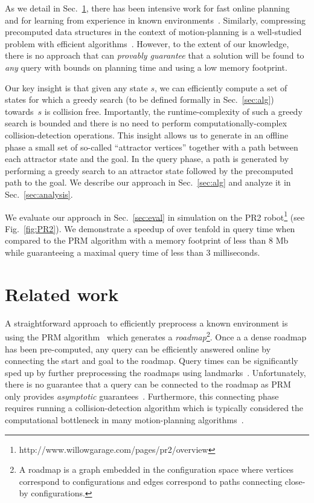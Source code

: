 \documentclass[letterpaper]{article} %
\begin{document}
As we detail in Sec.~\ref{sec:rel}, there has been intensive work 
for fast online planning~\cite{LA18} and 
for learning from experience in known environments~\cite{PCCL12,PDCL13,BAG12,CSMOC15}.
Similarly, compressing precomputed data structures in the context of motion-planning is a well-studied problem with efficient algorithms~\cite{SSAH14,DB14}.
However, to the extent of our knowledge, there is no approach that can \emph{provably guarantee} that a solution will be found to \emph{any} query with bounds on planning time and using a low memory footprint.


Our key insight is that given any state $s$, we can efficiently compute a set of states for which a greedy search (to be defined formally in Sec.~\ref{sec:alg}) towards~$s$ is collision free.
Importantly, the runtime-complexity of such a greedy search is bounded and there is no need to perform computationally-complex collision-detection operations. 
This insight allows us to generate in an offline phase a small set of so-called ``attractor vertices'' together with a path between each attractor state and the goal.
In the query phase, a path is generated by performing a greedy search to an attractor state followed by the precomputed path to the goal.
We describe our approach in Sec.~\ref{sec:alg} and analyze it in Sec.~\ref{sec:analysis}.


We evaluate our approach in Sec.~\ref{sec:eval} in simulation on the PR2 robot\footnote{http://www.willowgarage.com/pages/pr2/overview} (see Fig.~\ref{fig:PR2}).
We demonstrate a speedup of over tenfold in query time when compared to the \textsf{PRM} algorithm with a memory footprint of less than 8 Mb while guaranteeing a maximal query time of less than 3 milliseconds.


\section{Related work}
\label{sec:rel}
A straightforward approach to efficiently preprocess a known environment is using the \textsf{PRM} algorithm~\cite{kavraki1996probabilistic} which generates a \emph{roadmap}\footnote{A roadmap is a graph embedded in the configuration space where vertices correspond to configurations and edges correspond to paths connecting close-by configurations.}.
Once a a dense roadmap has been pre-computed, any query can be efficiently answered online by connecting the start and goal to the roadmap. 
Query times can be significantly sped up by further preprocessing the roadmaps using landmarks~\cite{paden2017landmark}.
Unfortunately, there is no guarantee that a query can be connected to the roadmap as \textsf{PRM} only provides \emph{asymptotic} guarantees~\cite{KKL98}.
Furthermore, this connecting phase requires running a collision-detection algorithm which is typically considered the computational bottleneck in many motion-planning algorithms~\cite{L06}.
\end{document}

